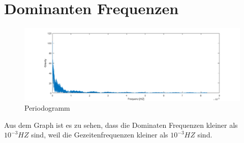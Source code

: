 \documentclass[12pt]{article}
\begin{document}
\section{Dominanten Frequenzen}
\begin{figure}[ht]\centering
	\includegraphics[width=1\textwidth]{fft.png}
	\caption{Periodogramm}
\end{figure}
Aus dem Graph ist es zu sehen, dass die Dominaten Frequenzen kleiner als $10^{-3} HZ$ sind, weil die Gezeitenfrequenzen kleiner als $10^{-3} HZ$ sind.
\end{document}
